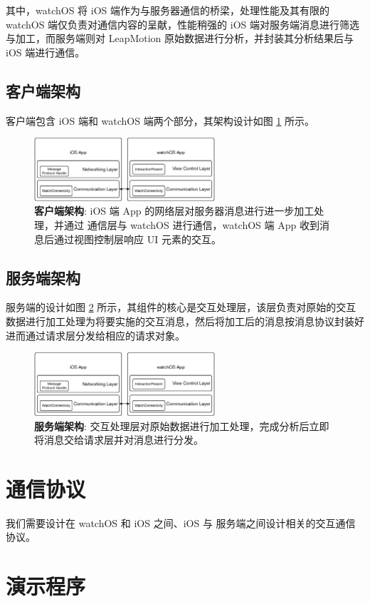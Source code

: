其中，watchOS 将 iOS 端作为与服务器通信的桥梁，处理性能及其有限的 watchOS 端仅负责对通信内容的呈献，性能稍强的 iOS 端对服务端消息进行筛选与加工，而服务端则对 LeapMotion 原始数据进行分析，并封装其分析结果后与 iOS 端进行通信。

\subsection{客户端架构}

客户端包含 iOS 端和 watchOS 端两个部分，其架构设计如图 \ref{fig:client-arch} 所示。

\begin{figure}[H]
    \centering
    \includegraphics[width=0.6\textwidth]{figures/client-arch}
    \caption{\kaishu \textbf{客户端架构}: iOS 端 App 的网络层对服务器消息进行进一步加工处理，并通过 通信层与 watchOS 进行通信，watchOS 端 App 收到消息后通过视图控制层响应 UI 元素的交互。}
    \label{fig:client-arch}
\end{figure}

\subsection{服务端架构}

服务端的设计如图 \ref{fig:server-arch} 所示，其组件的核心是交互处理层，该层负责对原始的交互数据进行加工处理为将要实施的交互消息，然后将加工后的消息按消息协议封装好进而通过请求层分发给相应的请求对象。

\begin{figure}[H]
    \centering
    \includegraphics[width=0.6\textwidth]{figures/client-arch}
    \caption{\kaishu \textbf{服务端架构}: 交互处理层对原始数据进行加工处理，完成分析后立即将消息交给请求层并对消息进行分发。}
    \label{fig:server-arch}
\end{figure}

\section{通信协议}

我们需要设计在 watchOS 和 iOS 之间、iOS 与 服务端之间设计相关的交互通信协议。

\section{演示程序}
